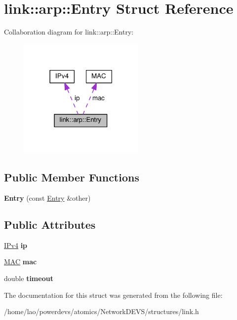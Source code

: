 \hypertarget{structlink_1_1arp_1_1Entry}{}\section{link\+:\+:arp\+:\+:Entry Struct Reference}
\label{structlink_1_1arp_1_1Entry}


Collaboration diagram for link\+:\+:arp\+:\+:Entry\+:\nopagebreak
\begin{figure}[H]
\begin{center}
\leavevmode
\includegraphics[width=174pt]{structlink_1_1arp_1_1Entry__coll__graph}
\end{center}
\end{figure}
\subsection*{Public Member Functions}
\begin{DoxyCompactItemize}
\item 
{\bfseries Entry} (const \hyperlink{structlink_1_1arp_1_1Entry}{Entry} \&other)\hypertarget{structlink_1_1arp_1_1Entry_ab2adef8c42d08549d72c9fba0839da5c}{}\label{structlink_1_1arp_1_1Entry_ab2adef8c42d08549d72c9fba0839da5c}

\end{DoxyCompactItemize}
\subsection*{Public Attributes}
\begin{DoxyCompactItemize}
\item 
\hyperlink{structIPv4}{I\+Pv4} {\bfseries ip}\hypertarget{structlink_1_1arp_1_1Entry_a40929f76ac846faefab32e92b290c92f}{}\label{structlink_1_1arp_1_1Entry_a40929f76ac846faefab32e92b290c92f}

\item 
\hyperlink{structMAC}{M\+AC} {\bfseries mac}\hypertarget{structlink_1_1arp_1_1Entry_a72cdde0b5131b1ecc350f5ae28bb7f8a}{}\label{structlink_1_1arp_1_1Entry_a72cdde0b5131b1ecc350f5ae28bb7f8a}

\item 
double {\bfseries timeout}\hypertarget{structlink_1_1arp_1_1Entry_a8838c1d16cd38f16032703d00742df7a}{}\label{structlink_1_1arp_1_1Entry_a8838c1d16cd38f16032703d00742df7a}

\end{DoxyCompactItemize}


The documentation for this struct was generated from the following file\+:\begin{DoxyCompactItemize}
\item 
/home/lao/powerdevs/atomics/\+Network\+D\+E\+V\+S/structures/link.\+h\end{DoxyCompactItemize}
